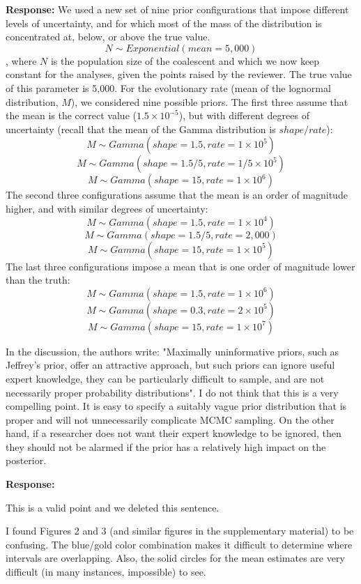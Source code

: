 \documentclass[11pt]{article}
\begin{document}
{\color{blue}
\textbf{Response:} 
We used a new set of nine prior configurations that impose different levels of uncertainty, and for which most of the mass of the distribution is concentrated at, below, or above the true value.
$$
N \sim Exponential(mean=5,000)
$$
, where $N$ is the population size of the coalescent and which we now keep constant for the analyses, given the points raised by the reviewer. The true value of this parameter is 5,000.
\newline
For the evolutionary rate (mean of the lognormal distribution, $M$), we considered nine possible priors. The first three assume that the mean is the correct value ($1.5\times10^{-5}$), but with different degrees of uncertainty (recall that the mean of the Gamma distribution is $shape/rate$):
\newline
$$
M \sim Gamma(shape = 1.5, rate = 1\times10^{5})
$$
$$
M \sim Gamma(shape = 1.5/5, rate = 1/5\times10^{5})
$$
$$
M \sim Gamma(shape = 15, rate = 1\times10^{6})
$$
\newline
The second three configurations assume that the mean is an order of magnitude higher, and with similar degrees of uncertainty:
\newline
$$
M \sim Gamma(shape = 1.5, rate = 1\times10^{4})
$$
$$
M \sim Gamma(shape = 1.5/5, rate = 2,000)
$$
$$
M \sim Gamma(shape = 15, rate = 1\times10^{5})
$$
\newline
The last three configurations impose a mean that is one order of magnitude lower than the truth:
$$
M \sim Gamma(shape = 1.5, rate = 1\times10^{6})
$$
$$
M \sim Gamma(shape = 0.3, rate = 2\times10^{5})
$$
$$
M \sim Gamma(shape = 15, rate = 1\times10^{7})
$$}

	
In the discussion, the authors write: "Maximally uninformative priors, such as Jeffrey’s prior, offer an attractive approach, but such priors can ignore useful expert knowledge, they can be particularly difficult to sample, and are not necessarily proper probability distributions". I do not think that this is a very compelling point. It is easy to specify a suitably vague prior distribution that is proper and will not unnecessarily complicate MCMC sampling. On the other hand, if a researcher does not want their expert knowledge to be ignored, then they should not be alarmed if the prior has a relatively high impact on the posterior.

{\color{blue}
\textbf{Response:}

This is a valid point and we deleted this sentence.
}

I found Figures 2 and 3 (and similar figures in the supplementary material) to be confusing. The blue/gold color combination makes it difficult to determine where intervals are overlapping. Also, the solid circles for the mean estimates are very difficult (in many instances, impossible) to see.
\end{document}
